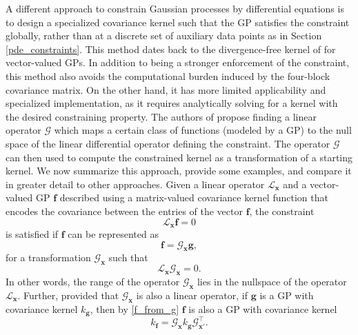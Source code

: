 \label{transformed_covariance}
A different approach to constrain Gaussian processes by differential equations is to design a specialized covariance kernel such that the GP satisfies the constraint globally, rather than at a discrete set of auxiliary data points as in Section \ref{pde_constraints}. This method dates back to the divergence-free kernel of  for vector-valued GPs. In addition to being a stronger enforcement of the constraint, this method also avoids the computational burden induced by the four-block covariance matrix. On the other hand, it has more limited applicability and specialized implementation, as it requires analytically solving for a kernel with the desired constraining property. The authors of  propose finding a linear operator $\mathcal{G}$ which maps a certain class of functions (modeled by a GP) to the null space of the linear differential operator defining the constraint. The operator $\mathcal{G}$ can then used to compute the constrained kernel as a transformation of a starting kernel. We now summarize this approach, provide some examples, and compare it in greater detail to other approaches. 
Given a linear operator $\mathcal{L}_{\mathbf{x}}$ and a vector-valued GP $\mathbf{f}$ described using a matrix-valued covariance kernel function that encodes the covariance between the entries of the vector $\mathbf{f}$, the constraint
\begin{equation}\label{transformed_constraint}
\mathcal{L}_{\mathbf{x}}\mathbf{f} = 0
\end{equation}
is satisfied if $\mathbf{f}$ can be represented as
\begin{equation}\label{f_from_g}
\mathbf{f} = \mathcal{G}_{\mathbf{x}}\mathbf{g},
\end{equation}
for a transformation $\mathcal{G}_{\mathbf{x}}$ such that
\begin{equation}\label{operator_equation}
\mathcal{L}_{\mathbf{x}} \mathcal{G}_{\mathbf{x}} = 0.
\end{equation}
In other words, the range of the operator $\mathcal{G}_{\mathbf{x}}$ lies in the nullspace of the operator $\mathcal{L}_{\mathbf{x}}$.
Further, provided that
$\mathcal{G}_{\mathbf{x}}$ is also a linear operator, if $\mathbf{g}$ is a GP with covariance kernel $k_{\mathbf{g}}$, then by  \eqref{f_from_g} $\mathbf{f}$ is also a GP with covariance kernel
\begin{equation}\label{transformed_kernel}
k_{\mathbf{f}} = \mathcal{G}_{\mathbf{x}} k_{\mathbf{g}} \mathcal{G}_{\mathbf{x'}}^\top.   
\end{equation}
